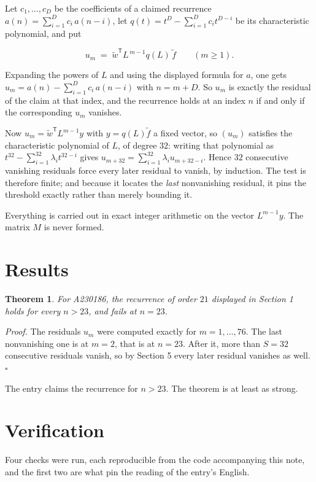 \documentclass[11pt]{article}
\newtheorem{theorem}{Theorem}
\theoremstyle{definition}
\begin{document}
Let $c_1,\dots,c_D$ be the coefficients of a claimed recurrence $a(n) = \sum_{i=1}^{D} c_i\,a(n-i)$, let $q(t) = t^{D} - \sum_{i=1}^{D} c_i t^{D-i}$ be its characteristic polynomial, and put

\[u_m \;=\; \tilde w^{\mathsf T} L^{\,m-1} q(L)\,\tilde f \qquad (m \ge 1).\]

Expanding the powers of $L$ and using the displayed formula for $a$, one gets $u_m = a(n) - \sum_{i=1}^{D} c_i\,a(n-i)$ with $n = m + D$. So $u_m$ is exactly the residual of the claim at that index, and the recurrence holds at an index $n$ if and only if the corresponding $u_m$ vanishes.

Now $u_m = \tilde w^{\mathsf T} L^{m-1} y$ with $y = q(L)\tilde f$ a fixed vector, so $(u_m)$ satisfies the characteristic polynomial of $L$, of degree $32$: writing that polynomial as $t^{32} - \sum_{i=1}^{32} \lambda_i t^{32-i}$ gives $u_{m+32} = \sum_{i=1}^{32} \lambda_i u_{m+32-i}$. Hence $32$ consecutive vanishing residuals force every later residual to vanish, by induction. The test is therefore finite; and because it locates the {\itshape last} nonvanishing residual, it pins the threshold exactly rather than merely bounding it.

Everything is carried out in exact integer arithmetic on the vector $L^{m-1}y$. The matrix $M$ is never formed.

\section{Results}

\begin{theorem} For A230186, the recurrence of order $21$ displayed in Section 1 holds for every $n > 23$, and fails at $n = 23$.\end{theorem}

{\itshape Proof.} The residuals $u_m$ were computed exactly for $m = 1,\dots,76$. The last nonvanishing one is at $m = 2$, that is at $n = 23$. After it, more than $S = 32$ consecutive residuals vanish, so by Section 5 every later residual vanishes as well. $\square$

The entry claims the recurrence for $n > 23$. The theorem is at least as strong.

\section{Verification}

Four checks were run, each reproducible from the code accompanying this note, and the first two are what pin the reading of the entry's English.
\end{document}
